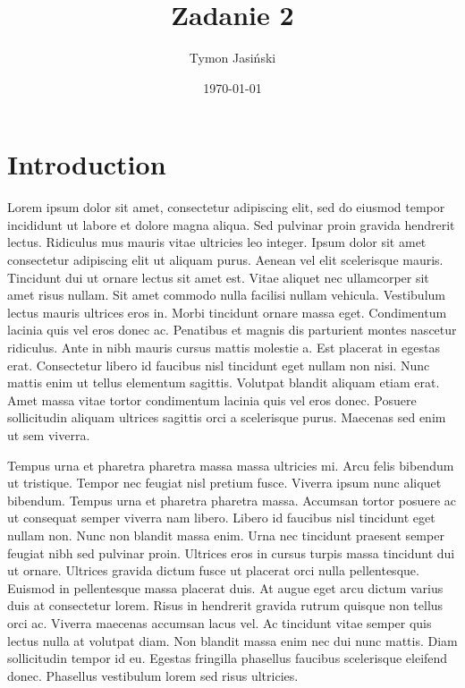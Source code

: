 \documentclass{beamer}
\title{Zadanie 2}
\author{Tymon Jasiński}
\date{\today}
\begin{document}
\maketitle

\section{Introduction}

\newpage
Lorem ipsum dolor sit amet, consectetur adipiscing elit, sed do eiusmod tempor incididunt ut labore et dolore magna aliqua. Sed pulvinar proin gravida hendrerit lectus. Ridiculus mus mauris vitae ultricies leo integer. Ipsum dolor sit amet consectetur adipiscing elit ut aliquam purus. Aenean vel elit scelerisque mauris. Tincidunt dui ut ornare lectus sit amet est. Vitae aliquet nec ullamcorper sit amet risus nullam. Sit amet commodo nulla facilisi nullam vehicula. Vestibulum lectus mauris ultrices eros in. Morbi tincidunt ornare massa eget. Condimentum lacinia quis vel eros donec ac. Penatibus et magnis dis parturient montes nascetur ridiculus. Ante in nibh mauris cursus mattis molestie a. Est placerat in egestas erat. Consectetur libero id faucibus nisl tincidunt eget nullam non nisi. Nunc mattis enim ut tellus elementum sagittis. Volutpat blandit aliquam etiam erat. Amet massa vitae tortor condimentum lacinia quis vel eros donec. Posuere sollicitudin aliquam ultrices sagittis orci a scelerisque purus. Maecenas sed enim ut sem viverra.

Tempus urna et pharetra pharetra massa massa ultricies mi. Arcu felis bibendum ut tristique. Tempor nec feugiat nisl pretium fusce. Viverra ipsum nunc aliquet bibendum. Tempus urna et pharetra pharetra massa. Accumsan tortor posuere ac ut consequat semper viverra nam libero. Libero id faucibus nisl tincidunt eget nullam non. Nunc non blandit massa enim. Urna nec tincidunt praesent semper feugiat nibh sed pulvinar proin. Ultrices eros in cursus turpis massa tincidunt dui ut ornare. Ultrices gravida dictum fusce ut placerat orci nulla pellentesque. Euismod in pellentesque massa placerat duis. At augue eget arcu dictum varius duis at consectetur lorem. Risus in hendrerit gravida rutrum quisque non tellus orci ac. Viverra maecenas accumsan lacus vel. Ac tincidunt vitae semper quis lectus nulla at volutpat diam. Non blandit massa enim nec dui nunc mattis. Diam sollicitudin tempor id eu. Egestas fringilla phasellus faucibus scelerisque eleifend donec. Phasellus vestibulum lorem sed risus ultricies.
\end{document}
